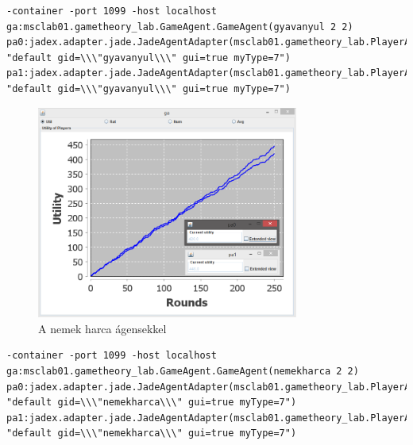 \begin{lstlisting}[caption=Gyáva nyúl run config, frame=single,float=!ht]
-container -port 1099 -host localhost 
ga:msclab01.gametheory_lab.GameAgent.GameAgent(gyavanyul 2 2) pa0:jadex.adapter.jade.JadeAgentAdapter(msclab01.gametheory_lab.PlayerAgent.Player 
"default gid=\\\"gyavanyul\\\" gui=true myType=7") 
pa1:jadex.adapter.jade.JadeAgentAdapter(msclab01.gametheory_lab.PlayerAgent.Player 
"default gid=\\\"gyavanyul\\\" gui=true myType=7")
\end{lstlisting}
		

		\begin{figure}[h]
		\begin{center}
		\includegraphics[height=7cm]{figures/nemek_jadex.png}
		\caption{A nemek harca ágensekkel}
		\end{center}
		\end{figure}

\begin{lstlisting}[caption=Nemek harca run config, frame=single,float=!ht]
-container -port 1099 -host localhost 
ga:msclab01.gametheory_lab.GameAgent.GameAgent(nemekharca 2 2) pa0:jadex.adapter.jade.JadeAgentAdapter(msclab01.gametheory_lab.PlayerAgent.Player 
"default gid=\\\"nemekharca\\\" gui=true myType=7") 
pa1:jadex.adapter.jade.JadeAgentAdapter(msclab01.gametheory_lab.PlayerAgent.Player 
"default gid=\\\"nemekharca\\\" gui=true myType=7")
\end{lstlisting}
		

